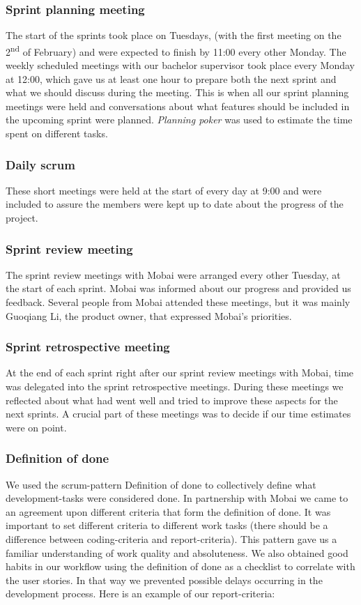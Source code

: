 \subsubsection*{Sprint planning meeting}
The start of the sprints took place on Tuesdays, (with the first meeting on the 2\textsuperscript{nd} of February) and were expected to finish by 11:00 every other Monday. The weekly scheduled meetings with our bachelor supervisor took place every Monday at 12:00, which gave us at least one hour to prepare both the next sprint and what we should discuss during the meeting. This is when all our sprint planning meetings were held and conversations about what features should be included in the upcoming sprint were planned. \textit{Planning poker} was used to estimate the time spent on different tasks.

\subsubsection*{Daily scrum}
These short meetings were held at the start of every day at 9:00 and were included to assure the members were kept up to date about the progress of the project.

\subsubsection*{Sprint review meeting}
The sprint review meetings with Mobai were arranged every other Tuesday, at the start of each sprint. Mobai was informed about our progress and provided us feedback. Several people from Mobai attended these meetings, but it was mainly Guoqiang Li, the product owner, that expressed Mobai's priorities. 

\subsubsection*{Sprint retrospective meeting}
At the end of each sprint right after our sprint review meetings with Mobai, time was delegated into the sprint retrospective meetings. During these meetings we reflected about what had went well and tried to improve these aspects for the next sprints. A crucial part of these meetings was to decide if our time estimates were on point. 

\subsubsection{Definition of done}
We used the scrum-pattern Definition of done \cite{DoneDone} to collectively define what development-tasks were considered done. In partnership with Mobai we came to an agreement upon different criteria that form the definition of done. It was important to set different criteria to different work tasks (there should be a difference between coding-criteria and report-criteria). This pattern gave us a familiar understanding of work quality and absoluteness. We also obtained good habits in our workflow using the definition of done as a checklist to correlate with the user stories. In that way we prevented possible delays occurring in the development process. Here is an example of our report-criteria: 

